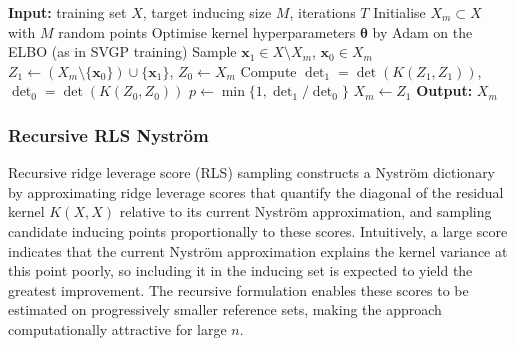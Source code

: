 \documentclass[11pt,a4paper]{article}
\providecommand{\Description}[1]{}
\newcommand{\bx}{\boldsymbol{x}}
\newcommand{\btheta}{\boldsymbol{\theta}}
\begin{document}
\begin{algorithm}
\caption{M-DPP inducing point selection \citep{Li2016FastDS}}
\label{alg:mdpp}
\begin{algorithmic}[1]
\State \textbf{Input:} training set $X$, target inducing size $M$, iterations $T$
\State Initialise $X_m \subset X$ with $M$ random points
\State Optimise kernel hyperparameters $\btheta$ by Adam on the ELBO (as in SVGP training)
    \State Sample $\bx_{1} \in X \setminus X_m$, $\bx_{0} \in X_m$
    \State $Z_1 \gets (X_m \setminus \{\bx_{0}\}) \cup \{\bx_{1}\}$, \quad $Z_0 \gets X_m$
    \State Compute $\det_1 = \det(K(Z_1,Z_1))$, \quad $\det_0 = \det(K(Z_0,Z_0))$
    \State $p \gets \min\{1, \det_1 / \det_0\}$
        \State $X_m \gets Z_1$
    \EndIf
\EndFor
\State \textbf{Output:} $X_m$
\end{algorithmic}
\Description{Pseudocode for fixed-size determinantal point process sampling. At each iteration, the method proposes replacing one selected input and accepts the swap according to the ratio of kernel Gram determinants.}
\end{algorithm}


\subsubsection{Recursive RLS Nyström}
\label{subsubsec:rls}
Recursive ridge leverage score (RLS) sampling \cite{NIPS2017_a03fa308} constructs a Nyström dictionary by approximating ridge leverage scores that quantify the diagonal of the residual kernel $K(X,X)$ relative to its current Nyström approximation, and sampling candidate inducing points proportionally to these scores. Intuitively, a large score indicates that the current Nyström approximation explains the kernel variance at this point poorly, so including it in the inducing set is expected to yield the greatest improvement. The recursive formulation enables these scores to be estimated on progressively smaller reference sets, making the approach computationally attractive for large $n$.
\end{document}
